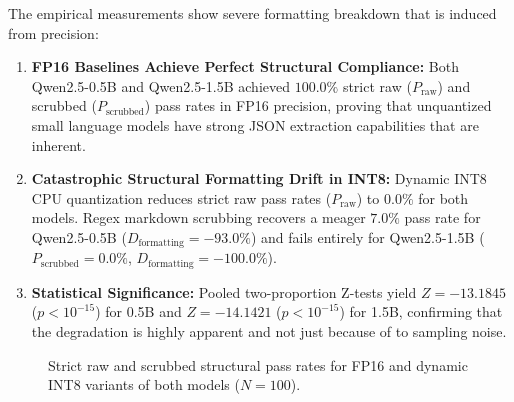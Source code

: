 \documentclass[10pt,journal,compsoc]{IEEEtran}
\begin{document}
The empirical measurements show severe formatting breakdown that is induced from precision:
\begin{enumerate}
    \item \textbf{FP16 Baselines Achieve Perfect Structural Compliance:} Both Qwen2.5-0.5B and Qwen2.5-1.5B achieved $100.0\%$ strict raw ($P_{\text{raw}}$) and scrubbed ($P_{\text{scrubbed}}$) pass rates in FP16 precision, proving that unquantized small language models have strong JSON extraction capabilities that are inherent.
    \item \textbf{Catastrophic Structural Formatting Drift in INT8:} Dynamic INT8 CPU quantization reduces strict raw pass rates ($P_{\text{raw}}$) to $0.0\%$ for both models. Regex markdown scrubbing recovers a meager $7.0\%$ pass rate for Qwen2.5-0.5B ($D_{\text{formatting}} = -93.0\%$) and fails entirely for Qwen2.5-1.5B ($P_{\text{scrubbed}} = 0.0\%$, $D_{\text{formatting}} = -100.0\%$).
    \item \textbf{Statistical Significance:} Pooled two-proportion Z-tests yield $Z = -13.1845$ ($p < 10^{-15}$) for 0.5B and $Z = -14.1421$ ($p < 10^{-15}$) for 1.5B, confirming that the degradation is highly apparent and not just because of to sampling noise.
\end{enumerate}

\begin{figure}[!t]
\centering
{}
\caption{Strict raw and scrubbed structural pass rates for FP16 and dynamic INT8 variants of both models ($N=100$).}
\label{fig:pass_rates}
\end{figure}
\end{document}
